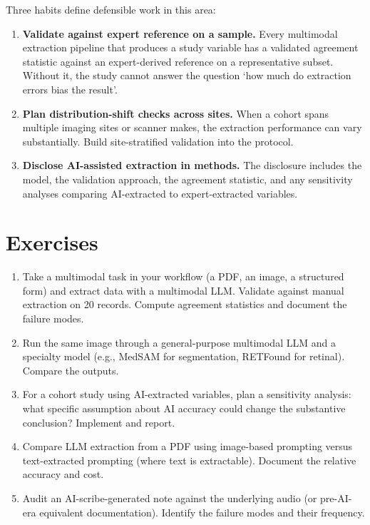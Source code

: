 \documentclass[
  letterpaper,
  11pt]{scrbook}
\begin{document}
Three habits define defensible work in this area:

\begin{enumerate}
\def\labelenumi{\arabic{enumi}.}
\item
  \textbf{Validate against expert reference on a sample.} Every
  multimodal extraction pipeline that produces a study variable has a
  validated agreement statistic against an expert-derived reference on a
  representative subset. Without it, the study cannot answer the
  question `how much do extraction errors bias the result'.
\item
  \textbf{Plan distribution-shift checks across sites.} When a cohort
  spans multiple imaging sites or scanner makes, the extraction
  performance can vary substantially. Build site-stratified validation
  into the protocol.
\item
  \textbf{Disclose AI-assisted extraction in methods.} The disclosure
  includes the model, the validation approach, the agreement statistic,
  and any sensitivity analyses comparing AI-extracted to
  expert-extracted variables.
\end{enumerate}

\section{Exercises}\label{exercises-6}

\begin{enumerate}
\def\labelenumi{\arabic{enumi}.}
\item
  Take a multimodal task in your workflow (a PDF, an image, a structured
  form) and extract data with a multimodal LLM. Validate against manual
  extraction on 20 records. Compute agreement statistics and document
  the failure modes.
\item
  Run the same image through a general-purpose multimodal LLM and a
  specialty model (e.g., MedSAM for segmentation, RETFound for retinal).
  Compare the outputs.
\item
  For a cohort study using AI-extracted variables, plan a sensitivity
  analysis: what specific assumption about AI accuracy could change the
  substantive conclusion? Implement and report.
\item
  Compare LLM extraction from a PDF using image-based prompting versus
  text-extracted prompting (where text is extractable). Document the
  relative accuracy and cost.
\item
  Audit an AI-scribe-generated note against the underlying audio (or
  pre-AI-era equivalent documentation). Identify the failure modes and
  their frequency.
\end{enumerate}
\end{document}
